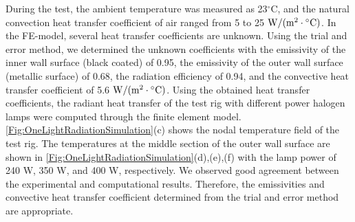 
During the test, the ambient temperature was measured as 23$^{\circ}$C, and the natural convection heat transfer coefficient of air ranged from 5 to 25 ${\rm{W/}}({\rm{m}^{2}} \cdot {}^ \circ {\rm{C}})$.
In the FE-model, several heat transfer coefficients are unknown.
Using the trial and error method, we determined the unknown coefficients with the emissivity of the inner wall surface (black coated) of 0.95, the emissivity of the outer wall surface (metallic surface) of 0.68, the radiation efficiency of 0.94, and the convective heat transfer coefficient of 5.6 ${\rm{W/}}({\rm{m}^{2}} \cdot {}^ \circ {\rm{C}})$.
Using the obtained heat transfer coefficients, the radiant heat transfer of the test rig with different power halogen lamps were computed through the finite element model. 
\ref{Fig:OneLightRadiationSimulation}(c) shows the nodal temperature field of the test rig. 
The temperatures at the middle section of the outer wall surface are shown in \ref{Fig:OneLightRadiationSimulation}(d),(e),(f) with the lamp power of 240 W, 350 W, and 400 W, respectively.
We observed good agreement between the experimental and computational results.
Therefore, the emissivities and convective heat transfer coefficient determined from the trial and error method are appropriate.

